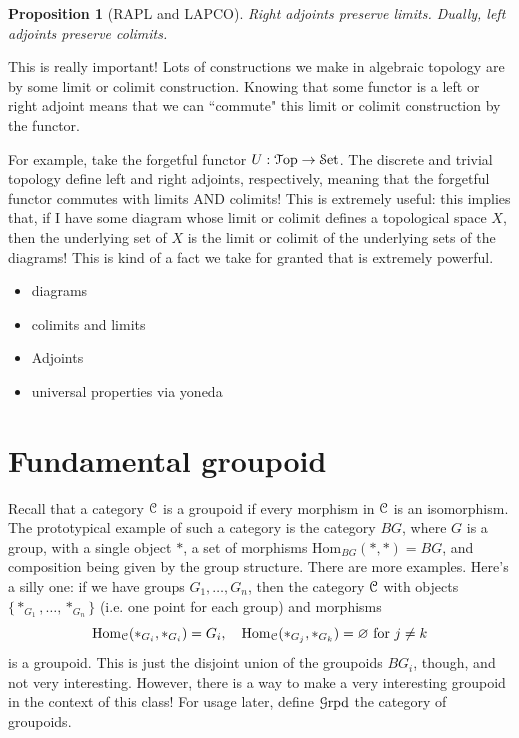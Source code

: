 \documentclass[10pt]{amsart}
\newcommand{\euscr}[1]{\EuScript{#1}}
\newtheorem{proposition}[thm]{Proposition}
\theoremstyle{definition}
\begin{document}
\begin{proposition}[RAPL and LAPCO]
    Right adjoints preserve limits. Dually, left adjoints preserve colimits.
\end{proposition}

This is really important! Lots of constructions we make in algebraic topology are by some limit or colimit construction. Knowing that some functor is a left or right adjoint means that we can ``commute" this limit or colimit construction by the functor. 

For example, take the forgetful functor $U:\euscr{T}\text{op} \to \euscr{S}\text{et}$. The discrete and trivial topology define left and right adjoints, respectively, meaning that the forgetful functor commutes with limits AND colimits! This is extremely useful: this implies that, if I have some diagram whose limit or colimit defines a topological space $X$, then the underlying set of $X$ is the limit or colimit of the underlying sets of the diagrams! This is kind of a fact we take for granted that is extremely powerful.

\begin{itemize}
    \item diagrams
    \item colimits and limits
    \item Adjoints
    \item universal properties via yoneda
\end{itemize}


\section{Fundamental groupoid}
Recall that a category $\euscr{C}$ is a groupoid if every morphism in $\euscr{C}$ is an isomorphism. The prototypical example of such a category is the category $BG$, where $G$ is a group, with a single object $*$, a set of morphisms $\text{Hom}_{BG}(*, *) = BG$, and composition being given by the group structure. There are more examples. Here's a silly one: if we have groups $G_1, \dots, G_n$, then the category $\euscr{C}$ with objects $\{*_{G_1}, \dots, *_{G_n}\}$ (i.e. one point for each group) and morphisms
\[\text{Hom}_{\euscr{C}}(*_{G_i}, *_{G_i})= G_i, \quad \text{Hom}_{\euscr{C}}(*_{G_j}, *_{G_k}) = \varnothing \text{ for }j \neq k\]
is a groupoid. This is just the disjoint union of the groupoids $BG_i$, though, and not very interesting. However, there is a way to make a very interesting groupoid in the context of this class! For usage later, define $\euscr{G}\text{rpd}$ the category of groupoids.
\end{document}
